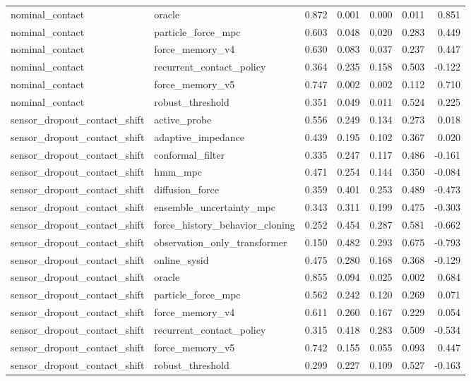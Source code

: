 \documentclass{article}
\begin{document}
\begin{longtable}{llrrrrr}
nominal\_contact & oracle & 0.872 & 0.001 & 0.000 & 0.011 & 0.851 \\
nominal\_contact & particle\_force\_mpc & 0.603 & 0.048 & 0.020 & 0.283 & 0.449 \\
nominal\_contact & force\_memory\_v4 & 0.630 & 0.083 & 0.037 & 0.237 & 0.447 \\
nominal\_contact & recurrent\_contact\_policy & 0.364 & 0.235 & 0.158 & 0.503 & -0.122 \\
nominal\_contact & force\_memory\_v5 & 0.747 & 0.002 & 0.002 & 0.112 & 0.710 \\
nominal\_contact & robust\_threshold & 0.351 & 0.049 & 0.011 & 0.524 & 0.225 \\
sensor\_dropout\_contact\_shift & active\_probe & 0.556 & 0.249 & 0.134 & 0.273 & 0.018 \\
sensor\_dropout\_contact\_shift & adaptive\_impedance & 0.439 & 0.195 & 0.102 & 0.367 & 0.020 \\
sensor\_dropout\_contact\_shift & conformal\_filter & 0.335 & 0.247 & 0.117 & 0.486 & -0.161 \\
sensor\_dropout\_contact\_shift & hmm\_mpc & 0.471 & 0.254 & 0.144 & 0.350 & -0.084 \\
sensor\_dropout\_contact\_shift & diffusion\_force & 0.359 & 0.401 & 0.253 & 0.489 & -0.473 \\
sensor\_dropout\_contact\_shift & ensemble\_uncertainty\_mpc & 0.343 & 0.311 & 0.199 & 0.475 & -0.303 \\
sensor\_dropout\_contact\_shift & force\_history\_behavior\_cloning & 0.252 & 0.454 & 0.287 & 0.581 & -0.662 \\
sensor\_dropout\_contact\_shift & observation\_only\_transformer & 0.150 & 0.482 & 0.293 & 0.675 & -0.793 \\
sensor\_dropout\_contact\_shift & online\_sysid & 0.475 & 0.280 & 0.168 & 0.368 & -0.129 \\
sensor\_dropout\_contact\_shift & oracle & 0.855 & 0.094 & 0.025 & 0.002 & 0.684 \\
sensor\_dropout\_contact\_shift & particle\_force\_mpc & 0.562 & 0.242 & 0.120 & 0.269 & 0.071 \\
sensor\_dropout\_contact\_shift & force\_memory\_v4 & 0.611 & 0.260 & 0.167 & 0.229 & 0.054 \\
sensor\_dropout\_contact\_shift & recurrent\_contact\_policy & 0.315 & 0.418 & 0.283 & 0.509 & -0.534 \\
sensor\_dropout\_contact\_shift & force\_memory\_v5 & 0.742 & 0.155 & 0.055 & 0.093 & 0.447 \\
sensor\_dropout\_contact\_shift & robust\_threshold & 0.299 & 0.227 & 0.109 & 0.527 & -0.163 \\
\bottomrule
\end{longtable}
\end{document}
